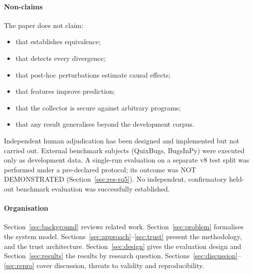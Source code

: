 \paragraph*{Non-claims} The paper does not claim:
\begin{itemize}
\item that \NDO{} establishes equivalence;
\item that \sbg{} detects every divergence;
\item that post-hoc perturbations estimate causal effects;
\item that \ers{} features improve prediction;
\item that the collector is secure against arbitrary programs;
\item that any result generalises beyond the development corpus.
\end{itemize}
Independent human adjudication has been designed and implemented but not carried out. External benchmark subjects (QuixBugs, BugsInPy) were executed only as development data. A single-run evaluation on a separate v8 test split was performed under a pre-declared protocol; its outcome was NOT DEMONSTRATED (Section~\ref{sec:res-rq5}). No independent, confirmatory held-out benchmark evaluation was successfully established.

\paragraph*{Organisation} Section~\ref{sec:background} reviews related work. Section~\ref{sec:problem} formalises the system model. Sections~\ref{sec:approach}--\ref{sec:trust} present the methodology, \ers{} and the trust architecture. Section~\ref{sec:design} gives the evaluation design and Section~\ref{sec:results} the results by research question. Sections~\ref{sec:discussion}--\ref{sec:repro} cover discussion, threats to validity and reproducibility.
